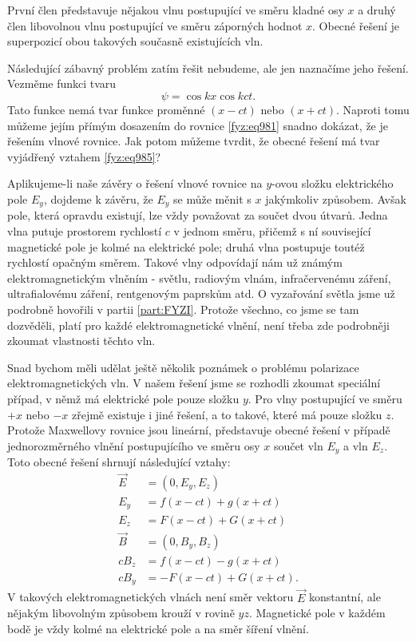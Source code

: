     První člen představuje nějakou vlnu postupující ve směru kladné osy \(x\) a druhý člen
    libovolnou vlnu postupující ve směru záporných hodnot \(x\). Obecné řešení je superpozicí obou
    takových současně existujících vln.
    
    Následující zábavný problém zatím řešit nebudeme, ale jen naznačíme jeho řešení. Vezměme funkci
    tvaru
    \begin{equation*}
      \psi=\cos kx\cos kct.
    \end{equation*}
    Tato funkce nemá tvar funkce proměnné \((x - ct)\) nebo \((x + ct)\). Naproti tomu můžeme jejím
    přímým dosazením do rovnice \eqref{fyz:eq981} snadno dokázat, že je řešením vlnové rovnice. Jak
    potom můžeme tvrdit, že obecné řešení má tvar vyjádřený vztahem \eqref{fyz:eq985}?
    
    Aplikujeme-li naše závěry o řešení vlnové rovnice na \(y\)-ovou složku elektrického pole
    \(E_y\), dojdeme k závěru, že \(E_y\) se může měnit s \(x\) jakýmkoliv způsobem. Avšak pole,
    která opravdu existují, lze vždy považovat za součet dvou útvarů. Jedna vlna putuje prostorem
    rychlostí \(c\) v jednom směru, přičemž s ní související magnetické pole je kolmé na elektrické
    pole; druhá vlna postupuje toutéž rychlostí opačným směrem. Takové vlny odpovídají nám už známým
    elektromagnetickým vlněním - světlu, radiovým vlnám, infračervenému záření, ultrafialovému
    záření, rentgenovým paprskům atd. O vyzařování světla jsme už podrobně hovořili v partii
    \ref{part:FYZI}. Protože všechno, co jsme se tam dozvěděli, platí pro každé elektromagnetické
    vlnění, není třeba zde podrobněji zkoumat vlastnosti těchto vln.
    
    Snad bychom měli udělat ještě několik poznámek o problému polarizace elektromagnetických vln. V
    našem řešení jsme se rozhodli zkoumat speciální případ, v němž má elektrické pole pouze složku
    \(y\). Pro vlny postupující ve směru \(+x\) nebo \(-x\) zřejmě existuje i jiné řešení, a to
    takové, které má pouze složku \(z\). Protože Maxwellovy rovnice jsou lineární, představuje
    obecné řešení v případě jednorozměrného vlnění postupujícího ve směru osy \(x\) součet vln
    \(E_y\) a vln \(E_z\). Toto obecné řešení shrnují následující vztahy:
    \begin{equation}\label{fyz:eq986}
      \begin{aligned}
        \vec{E}   &=(0,E_y,E_z)            \\[.5ex]
        E_y       &=f(x-ct)+g(x+ct)        \\[.5ex]
        E_z       &=F(x-ct)+G(x+ct)        \\[1ex]
        \vec{B}   &=(0,B_y,B_z)            \\[.5ex]
        cB_z      &=f(x-ct)-g(x+ct)        \\[.5ex]
        cB_y      &=-F(x-ct)+G(x+ct).
      \end{aligned}
    \end{equation}
    V takových elektromagnetických vlnách není směr vektoru \(\vec{E}\) konstantní, ale nějakým
    libovolným způsobem krouží v rovině \(yz\). Magnetické pole v každém bodě je vždy kolmé na
    elektrické pole a na směr šíření vlnění.
    
